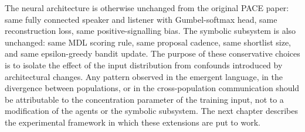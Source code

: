 The neural architecture is otherwise unchanged from the original PACE paper: same fully connected speaker and listener with Gumbel-softmax head, same reconstruction loss, same positive-signalling bias. The symbolic subsystem is also unchanged: same MDL scoring rule, same proposal cadence, same shortlist size, and same epsilon-greedy bandit update. The purpose of these conservative choices is to isolate the effect of the input distribution from confounds introduced by architectural changes. Any pattern observed in the emergent language, in the divergence between populations, or in the cross-population communication should be attributable to the concentration parameter of the training input, not to a modification of the agents or the symbolic subsystem. The next chapter describes the experimental framework in which these extensions are put to work.